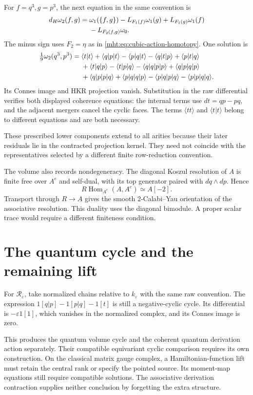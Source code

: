 For $f=q^3,g=p^3$, the next equation in the same convention is
\begin{align}\label{mht:eq:second-volume-equation}
 d_{\mathrm H}\omega_2(f,g)
 ={}&\omega_1(\{f,g\})
 -\mathcal L_{F_1(f)}\omega_1(g)
 +\mathcal L_{F_1(g)}\omega_1(f)\notag\\
 &-\mathcal L_{F_2(f,g)}\omega_0.
\end{align}
The minus sign uses $F_2=\eta$ as in
\eqref{mht:eq:cubic-action-homotopy}. One solution is
\begin{align}\label{mht:eq:second-volume-homotopy}
 \tfrac19\omega_2(q^3,p^3)
 ={}&\langle t|t\rangle
 +\langle q|p|t\rangle-\langle p|q|t\rangle
 -\langle q|t|p\rangle+\langle p|t|q\rangle\notag\\
 &+\langle t|q|p\rangle-\langle t|p|q\rangle
 -\langle q|q|p|p\rangle+\langle q|p|q|p\rangle\notag\\
 &+\langle q|p|p|q\rangle+\langle p|q|q|p\rangle
 -\langle p|q|p|q\rangle-\langle p|p|q|q\rangle.
\end{align}
Its Connes image and HKR projection vanish. Substitution in
the raw differential verifies both displayed coherence
equations: the internal terms use $dt=qp-pq$, and the
adjacent mergers cancel the cyclic faces. The terms
$\langle tt\rangle$ and $\langle t|t\rangle$ belong to
different equations and are both necessary.

These prescribed lower components extend to all arities
because their later residuals lie in the contracted projection
kernel. They need not coincide with the representatives
selected by a different finite row-reduction convention.

The volume also records nondegeneracy. The diagonal Koszul
resolution of $A$ is finite free over $A^e$ and self-dual,
with its top generator paired with $dq\wedge dp$. Hence
\[
 R\operatorname{Hom}_{A^e}(A,A^e)\simeq A[-2].
\]
Transport through $R\to A$ gives the smooth
$2$-Calabi--Yau orientation of the associative resolution.
This duality uses the diagonal bimodule. A proper scalar
trace would require a different finiteness condition.

\section{The quantum cycle and the remaining lift}

For $\mathcal R_\varepsilon$, take normalized chains relative
to $k_\varepsilon$ with the same raw convention. The expression
$1[q|p]-1[p|q]-1[t]$ is still a negative-cyclic cycle.
Its differential is $-\varepsilon1[1]$, which vanishes in
the normalized complex, and its Connes image is zero.

This produces the quantum volume cycle and the coherent
quantum derivation action separately. Their compatible
equivariant cyclic comparison requires its own construction.
On the classical matrix gauge complex, a Hamiltonian-function
lift must retain the central rank or specify the pointed source.
Its moment-map equations still require compatible solutions.
The associative derivation contraction supplies neither
conclusion by forgetting the extra structure.
